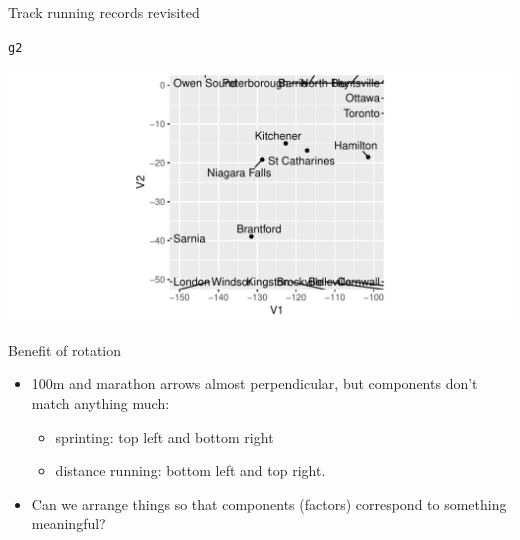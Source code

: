 \documentclass[unknownkeysallowed]{beamer}\usepackage[]{graphicx}\usepackage[]{color}
\makeatletter
\def\maxwidth{ %
  \ifdim\Gin@nat@width>\linewidth
    \linewidth
  \else
    \Gin@nat@width
  \fi
}
\newcommand{\hlstd}[1]{\textcolor[rgb]{0.345,0.345,0.345}{#1}}%
\newenvironment{kframe}{%
 \def\at@end@of@kframe{}%
 \ifinner\ifhmode%
  \def\at@end@of@kframe{\end{minipage}}%
  \begin{minipage}{\columnwidth}%
 \fi\fi%
 \def\FrameCommand##1{\hskip\@totalleftmargin \hskip-\fboxsep
 \colorbox{shadecolor}{##1}\hskip-\fboxsep
     \hskip-\linewidth \hskip-\@totalleftmargin \hskip\columnwidth}%
 \MakeFramed {\advance\hsize-\width
   \@totalleftmargin\z@ \linewidth\hsize
   \@setminipage}}%
 {\par\unskip\endMakeFramed%
 \at@end@of@kframe}
\newenvironment{knitrout}{}{} %
\makeatother
\begin{document}
\begin{frame}[fragile]{Track running records revisited}

\begin{knitrout}
\color{fgcolor}\begin{kframe}
\begin{alltt}
\hlstd{g2}
\end{alltt}
\end{kframe}
\includegraphics[width=\maxwidth]{figure/unnamed-chunk-477-1} 

\end{knitrout}

\end{frame}

\begin{frame}{Benefit of rotation}
  
  \begin{itemize}
  \item 100m and marathon arrows almost perpendicular, but components
    don't match anything much:
    \begin{itemize}
    \item sprinting: top left and bottom right
    \item distance running: bottom left and top right.
    \end{itemize}
  \item Can we arrange things so that components (factors) correspond
    to something meaningful?
  \end{itemize}
  
\end{frame}
\end{document}
